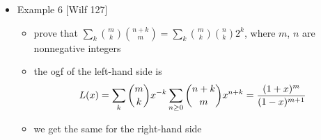 \documentclass[10pt, a4paper]{article}
\begin{document}
\begin{itemize}
\item
Example 6 [Wilf 127]
\begin{itemize}
    \item prove that $\sum_{k} {m\choose k}{n+k\choose m} = \sum_k {m\choose k}{n\choose k}2^k$, where $m$, $n$ are nonnegative integers
    \item the ogf of the left-hand side is
        $$L(x) = \sum_{k} {m\choose k} x^{-k}\sum_{n\ge 0}{n+k\choose m}x^{n+k} ={(1+x)^m\over (1-x)^{m+1}}$$
    \item we get the same for the right-hand side
\end{itemize}


\end{itemize}

\newpage
\end{document}
